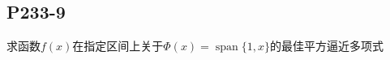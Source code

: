 \subsection{P233-9}
求函数$f(x)$在指定区间上关于$\Phi(x)=\operatorname{span}\{1,x\}$的最佳平方逼近多项式
\renewcommand{\COEFFICIENTS}[5]{
\begin{align*}
b_{0}   = \FUNCDOT{1}{f} & = \INTRANGE{1 \cdot \FX}{x} = #1 &
b_{1}   = \FUNCDOT{x}{f} & = \INTRANGE{x \cdot \FX}{x} = #2 \\
g_{0,0} = \FUNCDOT{1}{1} & = \INTRANGE{1 \cdot 1}{x}   = #3 &
g_{0,1} = \FUNCDOT{1}{x} & = \INTRANGE{1 \cdot x}{x}   = #4 \\
g_{1,0} = \FUNCDOT{x}{1} & = \INTRANGE{x \cdot 1}{x}   = #4 &
g_{1,1} = \FUNCDOT{x}{x} & = \INTRANGE{x \cdot x}{x}   = #5 \\
\end{align*}
}

\newcommand{\EQUATION}{
\begin{displaymath}
\begin{pmatrix}
g_{0,0} &
g_{0,1} \\
g_{1,0} &
g_{1,1} \\
\end{pmatrix}
\begin{pmatrix}
a_{0} \\
a_{1} \\
\end{pmatrix}
=
\begin{pmatrix}
b_{0} \\
b_{1} \\
\end{pmatrix}
\end{displaymath}
}

\newcommand{\SOLUTION}[4]{
\begin{align*}
a_{0}  & = #1 &
a_{1}  & = #2 \\
\end{align*}
\begin{displaymath}
P_1(x) = (#2) x + (#1) = #4 x #3 \\
\end{displaymath}
}

\newcommand{\PATTERN}[9]{
$f(x) = \FX, x \in [\LRANGE, \RRANGE]$
\begin{SOLVE}
设$f(x)$的最佳平方逼近多项式为$P_1(x)$，取$\rho(x) \equiv 1$，有
\COEFFICIENTS{#1}{#2}{#3}{#4}{#5}
由
\EQUATION
解得
\SOLUTION{#6}{#7}{#8}{#9}
\end{SOLVE}
}



